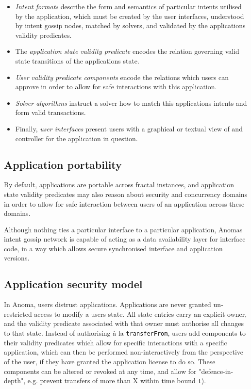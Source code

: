 \begin{itemize}
\tightlist
\item
  \emph{Intent formats} describe the form and semantics of particular
  intents utilised by the application, which must be created by the user
  interfaces, understood by intent gossip nodes, matched by solvers, and
  validated by the application\textquotesingle s validity predicates.
\item
  The \emph{application state validity predicate} encodes the relation
  governing valid state transitions of the application\textquotesingle s
  state.
\item
  \emph{User validity predicate components} encode the relations which
  users can approve in order to allow for safe interactions with this
  application.
\item
  \emph{Solver algorithms} instruct a solver how to match this
  application\textquotesingle s intents and form valid transactions.
\item
  Finally, \emph{user interfaces} present users with a graphical or
  textual view of and controller for the application in question.
\end{itemize}

\subsection{Application portability}\label{application-portability}

By default, applications are portable across fractal instances, and
application state validity predicates may also reason about security and
concurrency domains in order to allow for safe interaction between users
of an application across these domains.

Although nothing ties a particular interface to a particular
application, Anoma\textquotesingle s intent gossip network is capable of
acting as a data availability layer for interface code, in a way which
allows secure synchronised interface and application versions.

\subsection{Application security
model}\label{application-security-model}

In Anoma, users distrust applications. Applications are never granted
un-restricted access to modify a user\textquotesingle s state. All state
entries carry an explicit owner, and the validity predicate associated
with that owner must authorise all changes to that state. Instead of
authorising à la \texttt{transferFrom}, users add components to their
validity predicates which allow for specific interactions with a
specific application, which can then be performed non-interactively from
the perspective of the user, if they have granted the application
license to do so. These components can be altered or revoked at any
time, and allow for "defence-in-depth", e.g. prevent transfers of more
than X within time bound \texttt{t}).

